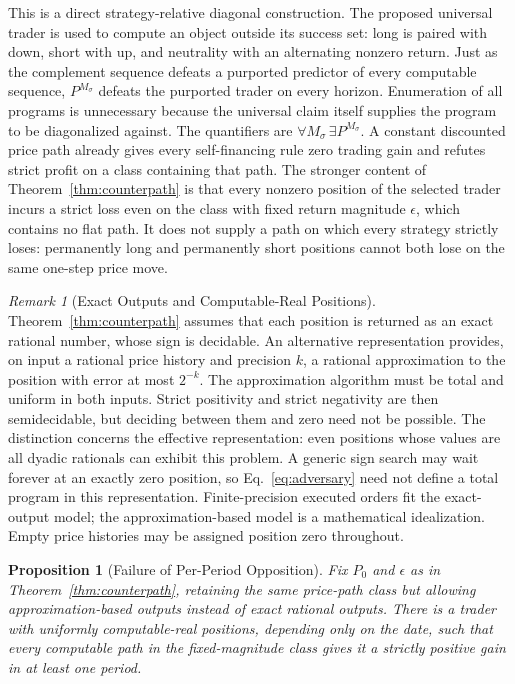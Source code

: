 \documentclass[aps,pra,reprint,superscriptaddress,amsmath,amssymb,floatfix]{revtex4-2}
\theoremstyle{plain}
\newtheorem{proposition}[theorem]{Proposition}
\theoremstyle{definition}
\theoremstyle{remark}
\newtheorem{remark}{Remark}
\begin{document}
This is a direct strategy-relative diagonal construction. The proposed
universal trader is used to compute an object outside its success set: long is
paired with down, short with up, and neutrality with an alternating nonzero
return. Just as
the complement sequence defeats a purported predictor of every computable
sequence, \(P^{M_\sigma}\) defeats the purported trader on every horizon.
Enumeration of all programs is unnecessary because the universal claim itself
supplies the program to be diagonalized against. The quantifiers are
\(\forall M_\sigma\,\exists P^{M_\sigma}\). A constant discounted price path
already gives every self-financing rule zero trading gain and refutes strict
profit on a class containing that path. The stronger content of
Theorem~\ref{thm:counterpath} is that every nonzero position of the selected
trader incurs a strict loss even on the class with fixed return magnitude
\(\epsilon\), which contains no flat path. It does not supply a path on which every strategy
strictly loses: permanently long and permanently short positions cannot both
lose on the same one-step price move.

\begin{remark}[Exact Outputs and Computable-Real Positions]
\label{rem:rational}
Theorem~\ref{thm:counterpath} assumes that each position is returned as an
exact rational number, whose sign is decidable. An alternative representation
provides, on input a rational price history and precision \(k\), a rational
approximation to the position with error at most \(2^{-k}\). The approximation
algorithm must be total and uniform in both inputs. Strict positivity and
strict negativity are then semidecidable, but deciding between them and zero
need not be possible. The distinction concerns the effective representation:
even positions whose values are all dyadic rationals can exhibit this problem.
A generic sign search may wait forever at an exactly zero position, so
Eq.~\eqref{eq:adversary} need not define a total program in this representation.
Finite-precision executed orders fit the exact-output model; the
approximation-based model is a mathematical idealization.
Empty price histories may be assigned position zero throughout.
\end{remark}

\begin{proposition}[Failure of Per-Period Opposition]
\label{prop:real-positions}
Fix \(P_0\) and \(\epsilon\) as in Theorem~\ref{thm:counterpath}, retaining
the same price-path class but allowing approximation-based outputs instead
of exact rational outputs.
There is a trader with uniformly computable-real positions, depending only
on the date, such that every computable path in the fixed-magnitude class
gives it a strictly positive gain in at least one period.
\end{proposition}
\end{document}
